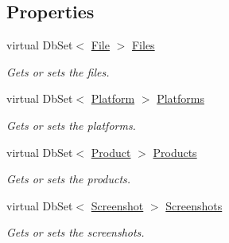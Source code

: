 \subsection*{Properties}
\begin{DoxyCompactItemize}
\item 
virtual Db\+Set$<$ \hyperlink{class_open_1_1_g_i_1_1hypermart_1_1_models_1_1_file}{File} $>$ \hyperlink{class_open_1_1_g_i_1_1hypermart_1_1_d_a_l_1_1_hypermart_context_aa42b145ebbfe133c3bc2beddfb23de36}{Files}
\begin{DoxyCompactList}\small\item\em Gets or sets the files. \end{DoxyCompactList}\item 
virtual Db\+Set$<$ \hyperlink{class_open_1_1_g_i_1_1hypermart_1_1_models_1_1_platform}{Platform} $>$ \hyperlink{class_open_1_1_g_i_1_1hypermart_1_1_d_a_l_1_1_hypermart_context_aff4be9e14ae1b0224c5a7b780050222f}{Platforms}
\begin{DoxyCompactList}\small\item\em Gets or sets the platforms. \end{DoxyCompactList}\item 
virtual Db\+Set$<$ \hyperlink{class_open_1_1_g_i_1_1hypermart_1_1_models_1_1_product}{Product} $>$ \hyperlink{class_open_1_1_g_i_1_1hypermart_1_1_d_a_l_1_1_hypermart_context_a2673d17b8a620d2f9f11f44edd5d86ef}{Products}
\begin{DoxyCompactList}\small\item\em Gets or sets the products. \end{DoxyCompactList}\item 
virtual Db\+Set$<$ \hyperlink{class_open_1_1_g_i_1_1hypermart_1_1_models_1_1_screenshot}{Screenshot} $>$ \hyperlink{class_open_1_1_g_i_1_1hypermart_1_1_d_a_l_1_1_hypermart_context_a267136fa00e08f78b49a0a888e548bef}{Screenshots}
\begin{DoxyCompactList}\small\item\em Gets or sets the screenshots. \end{DoxyCompactList}\end{DoxyCompactItemize}


